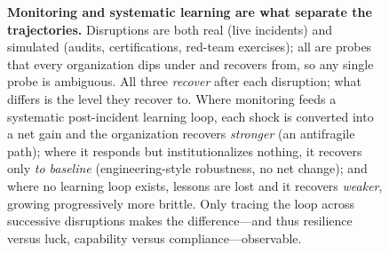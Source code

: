 \begin{figure}[t]
\caption{\textbf{Monitoring and systematic learning are what separate the
trajectories.} Disruptions are both real (live incidents) and simulated
(audits, certifications, red-team exercises); all are probes that every
organization dips under and recovers from, so any single probe is ambiguous.
All three \emph{recover} after each disruption; what differs is the level they
recover to. Where monitoring feeds a systematic post-incident learning loop,
each shock is converted into a net gain and the organization recovers
\emph{stronger} (an antifragile path); where it responds but institutionalizes
nothing, it recovers only \emph{to baseline} (engineering-style robustness, no net
change); and where no learning loop exists, lessons are lost and it recovers
\emph{weaker}, growing progressively more brittle. Only tracing the loop across
successive disruptions makes the difference---and thus resilience versus luck,
capability versus compliance---observable.}
\label{fig:trace_vs_snapshot}
\end{figure}
